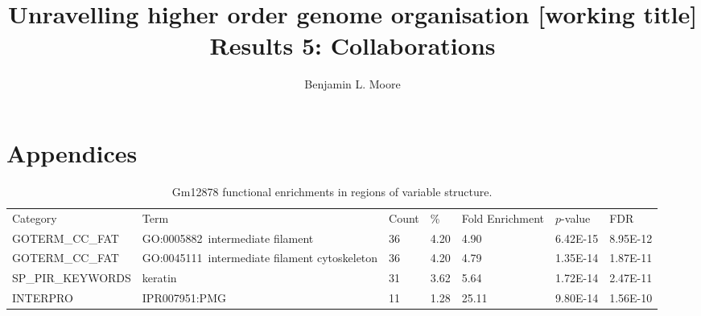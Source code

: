 \documentclass[a4paper,10pt,oneside]{book}
\title{ \vspace{3in} Unravelling higher order genome organisation {\small [working
    title]} \\ \vspace{2em} {\large {\bf Results 5: Collaborations}} }
\author{Benjamin L. Moore}
\begin{document}
\chapter{Appendices}

\setcounter{table}{0}
\makeatletter 
\renewcommand{\thetable}{A\@arabic\c@table}
\makeatother


{\scriptsize 
\begin{longtable}{lllllll}
\caption{
Gm12878 functional enrichments in regions of variable structure.
}\\
\endfirsthead
Category          & Term                                          &
Count & \%   & Fold Enrichment & $p$-value   & FDR      \\
GOTERM\_CC\_FAT   & GO:0005882~intermediate filament              & 36    & 4.20 & 4.90            & 6.42E-15 & 8.95E-12 \\
GOTERM\_CC\_FAT   & GO:0045111~intermediate filament cytoskeleton & 36    & 4.20 & 4.79            & 1.35E-14 & 1.87E-11 \\
SP\_PIR\_KEYWORDS & keratin                                       & 31    & 3.62 & 5.64            & 1.72E-14 & 2.47E-11 \\
INTERPRO          & IPR007951:PMG                                 & 11    & 1.28 & 25.11           & 9.80E-14 & 1.56E-10
\end{longtable}
}

\clearpage
\end{document}
